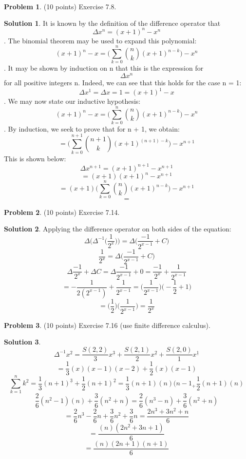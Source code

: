 \documentclass{article}
\theoremstyle{definition}
\newtheorem{problem}{Problem}
\newtheorem*{solution}{Solution}
\begin{document}
\begin{problem} (10 points)
Exercise 7.8. 
\end{problem}
\begin{solution}
It is known by the definition of the difference operator that \[\Delta x^n = (x+1)^n - x^n\]. The binomial theorem may be used to expand this polynomial: \[ (x+1)^n - x = \bigg(\sum\limits_{k=0}^n {{n \choose {k}} (x+1)^{n-k}}\bigg) - x^n\]. It may be shown by induction on n that this is the expression for \[\Delta x^n\] for all positive integers n. Indeed, we can see that this holds for the case n = 1: \[\Delta x^1 = \Delta x = 1 = (x + 1)^1 - x\]. We may now state our inductive hypothesis:\[ (x+1)^n - x = \bigg(\sum\limits_{k=0}^n {{n \choose {k}} (x+1)^{n-k}}\bigg) - x^n\]. By induction, we seek to prove that for n + 1, we obtain: \[=\bigg(\sum\limits_{k=0}^{n+1} {{n+1 \choose {k}} (x+1)^{(n+1)-k}}\bigg) - x^{n+1}\]
This is shown below:
\[\Delta x^{n+1} = (x+1)^{n+1} - x^{n+1}\]
\[= (x+1)(x+1)^n - x^{n+1}\]
\[= (x+1)\bigg(\sum\limits_{k=0}^n {{n \choose {k}} (x+1)^{n-k}}\bigg) - x^{n+1}\]
\[=\]


\end{solution}

\begin{problem} (10 points)
Exercise 7.14.
\end{problem}
\begin{solution}
Applying the difference operator on both sides of the equation:
\[\Delta\big(\Delta^{-1}\big(\frac{1}{2^x}\big)\big) = \Delta\big(\frac{-1}{2^{x-1}}+C\big) \]
\[\frac{1}{2^{x}} = \Delta\big(\frac{-1}{2^{x-1}}+C\big)\]
\[\Delta\frac{-1}{2^{x}} + \Delta C = \Delta\frac{-1}{2^{x-1}}+0 = \frac{-1}{2^{x}} + \frac{1}{2^{x-1}}\]
\[= - \frac{1}{2(2^{x-1})} +\frac{1}{2^{x-1}} = \big(\frac{1}{2^{x-1}} \big)\big(-\frac{1}{2}+1 \big) \]
\[= \big(\frac{1}{2}\big)\big(\frac{1}{2^{x-1}}\big) = \frac{1}{2^{x}} \]
\end{solution}

\begin{problem} (10 points)
Exercise 7.16 (use finite difference calculus).
\end{problem}
\begin{solution}
\[\Delta^{-1} x^{2} = \frac{S(2,2)}{3}x^{\underline{3}} + \frac{S(2,1)}{2}x^{\underline{2}}+ \frac{S(2,0)}{1}x^{\underline{1}}\]
\[= \frac{1}{3}(x)(x-1)(x-2) + \frac{1}{2}(x)(x-1)\]
\[\sum\limits_{k=1}^n k^{2} = \frac{1}{3}(n+1)^{\underline{3}} + \frac{1}{2}(n+1)^{\underline{2}} = \frac{1}{3}(n+1)(n)(n-1_ + \frac{1}{2}(n+1)(n)\]
\[\frac{2}{6}(n^{2}-1)(n) + \frac{3}{6}(n^{2}+n) = \frac{2}{6}(n^{3}-n) + \frac{3}{6}(n^{2}+n)\]
\[= \frac{2}{6}n^{3} - \frac{2}{6}n + \frac{3}{6}n^{2} + \frac{3}{6}n = \frac{2n^{3} + 3n^{2} + n}{6}\]
\[=\frac{(n)(2n^{2}+3n+1)}{6} \]
\[=  \frac{(n)(2n+1)(n+1)}{6}\]
\end{solution}
\end{document}
